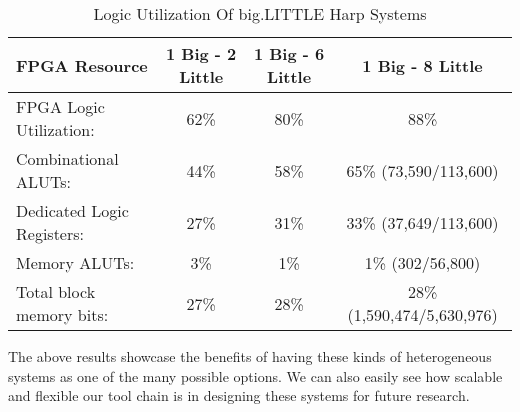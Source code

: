 \begin{table}[!htbp]
  \centering
  \begin{tabular}{|l|c|c|c|}
    \hline
FPGA Resource					& 1 Big - 2 Little	&1 Big - 6 Little		&1 Big - 8 Little\\
    \hline
FPGA Logic Utilization:		& 62\% 				& 80\% 				& 88\% \\
   Combinational ALUTs:		& 44\% 				& 58\%				& 65\% (73,590/113,600)\\
   Dedicated Logic Registers:	& 27\%			& 31\%				&33\% (37,649/113,600)\\
   Memory ALUTs:				& 3\%					& 1\%					& 1\% (302/56,800)\\
Total block memory bits:	& 27\%				& 28\%				& 28\% (1,590,474/5,630,976)\\
    \hline
  \end{tabular}
  \caption{Logic Utilization Of big.LITTLE Harp Systems}
  \label{table:fpga_util4}
\end{table}

The above results showcase the benefits of having these kinds of heterogeneous systems as one of the many possible options. We can also easily see how scalable and flexible our tool chain is in designing these systems for future research. 
